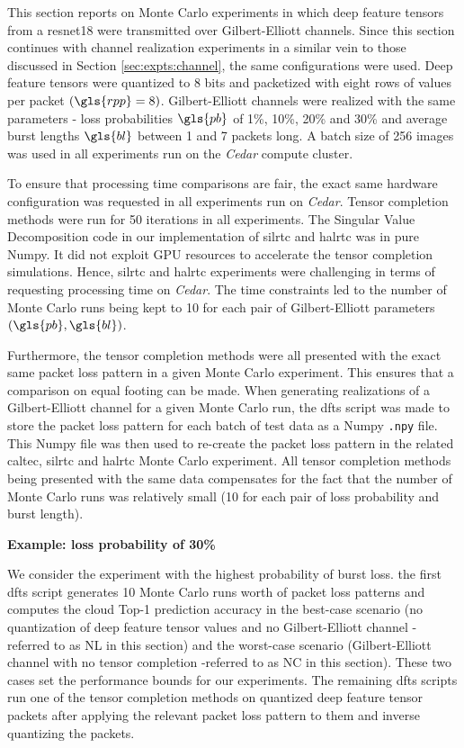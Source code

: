 This section reports on Monte Carlo experiments in which deep feature tensors from a \gls{resnet18} were transmitted over Gilbert-Elliott channels. Since this section continues with channel realization experiments in a similar vein to those discussed in Section \ref{sec:expts:channel}, the same configurations were used. Deep feature tensors were quantized to 8 bits and packetized with eight rows of values per packet $(\gls{rpp} = 8)$. Gilbert-Elliott channels were realized with the same parameters - loss probabilities $\gls{pb}$ of 1\%, 10\%, 20\% and 30\% and average burst lengths $\gls{bl}$ between 1 and 7 packets long. A batch size of 256 images was used in all experiments run on the \textit{Cedar} compute cluster. 

To ensure that processing time comparisons are fair, the exact same hardware configuration was requested in all experiments run on \textit{Cedar}. Tensor completion methods were run for 50 iterations in all experiments. The Singular Value Decomposition code in our implementation of \gls{silrtc} and \gls{halrtc} was in pure Numpy. It did not exploit GPU resources to accelerate the tensor completion simulations. Hence, \gls{silrtc} and \gls{halrtc} experiments were challenging in terms of requesting processing time on \textit{Cedar}. The time constraints led to the number of Monte Carlo runs being kept to 10 for each pair of Gilbert-Elliott parameters $(\gls{pb},\gls{bl})$. 

Furthermore, the tensor completion methods were all presented with the exact same packet loss pattern in a given Monte Carlo experiment. This ensures that a comparison on equal footing can be made. When generating realizations of a Gilbert-Elliott channel for a given Monte Carlo run, the \gls{dfts} script was made to store the packet loss pattern for each batch of test data as a Numpy \verb|.npy| file. This Numpy file was then used to re-create the packet loss pattern in the related \gls{caltec}, \gls{silrtc} and \gls{halrtc} Monte Carlo experiment. All tensor completion methods being presented with the same data compensates for the fact that the number of Monte Carlo runs was relatively small (10 for each pair of loss probability and burst length).

\textbf{Example: loss probability of 30\%}

We consider the experiment with the highest probability of burst loss. the first \gls{dfts} script generates 10 Monte Carlo runs worth of packet loss patterns and computes the cloud Top-1 prediction accuracy in the best-case scenario (no quantization of deep feature tensor values and no Gilbert-Elliott channel - referred to as NL in this section) and the worst-case scenario (Gilbert-Elliott channel with no tensor completion -referred to as NC in this section). These two cases set the performance bounds for our experiments. The remaining \gls{dfts} scripts run one of the tensor completion methods on quantized deep feature tensor packets after applying the relevant packet loss pattern to them and inverse quantizing the packets.

